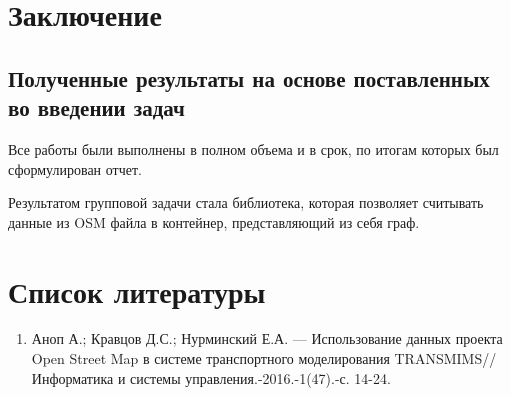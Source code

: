 \chapter{Заключение}
\section{Полученные результаты на основе поставленных во введении задач}
\noindent\indent Все работы были выполнены в полном объема и в срок,
по итогам которых был сформулирован отчет.
\par Результатом групповой задачи стала библиотека, которая позволяет считывать
данные из OSM файла в контейнер, представляющий из себя граф.

\chapter{Список литературы}
\begin{enumerate}
  \item Аноп А.; Кравцов Д.С.; Нурминский Е.А. --- Использование данных проекта
  Open Street Map в системе транспортного моделирования TRANSMIMS// Информатика
  и системы управления.-2016.-1(47).-с. 14-24.
\end{enumerate}
